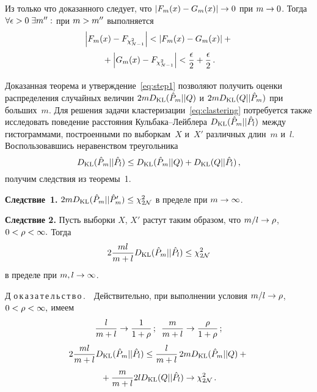 \begin{multicols}{2}
Из только что доказанного следует, что $|F_m(x) \hm- G_m(x)| \hm\rightarrow 0 $
при $m\hm\rightarrow 0$. Тогда $\forall \epsilon \hm> 0 \;\exists m'':$
при $m \hm> m''$ выполняется
\begin{multline*}
\left\vert F_m(x) - F_{\chi^2_{N-1}}\right\vert
< \left\vert F_m(x) - G_m(x)\right\vert + {}\\
{}+\left\vert G_m(x) - F_{\chi^2_{N-1}}\right\vert
< \displaystyle\frac{\displaystyle \epsilon\mathstrut}{\displaystyle 2\mathstrut} + \displaystyle\frac{\displaystyle \epsilon\mathstrut}{\displaystyle 2\mathstrut}\,.
\end{multline*}


\smallskip

Доказанная теорема и утверждение~\eqref{eq:step1} позволяют получить
оценки распределения случайных величин $2m{D}_{\mathrm{KL}}(\hat{P}_m||Q)$ и
$2m{D}_{\mathrm{KL}}(Q||\hat{P}_m)$ при больших~$m$. Для решения задачи
кластеризации~\eqref{eq:clastering} потребуется также исследовать
поведение расстояния Куль\-ба\-ка--Лейблера
${D}_{\mathrm{KL}}(\hat{P}_m||\hat{P}_l)$ между гистограммами, построенными по выборкам~$X$
и~$X'$ различных длин~$m$ и~$l$. Воспользовавшись неравенством треугольника
$$
D_{\mathrm{KL}}(\hat{P}_m||\hat{P}_l)  \leq D_{\mathrm{KL}}(\hat{P}_m||Q)
+ D_{\mathrm{KL}}(Q||\hat{P}_l)\,,
$$
получим следствия из теоремы~1.

\smallskip

\noindent
\textbf{Следствие~1.}
$ 2m{D}_{\mathrm{KL}}(\hat{P}_m||\hat{P}'_m)  \leq \chi^2_{2\mathcal{N}}$ в
пределе при $m\hm\rightarrow\infty$. \\

\smallskip

\noindent
\textbf{Следствие 2.} Пусть выборки $X$, $X'$ растут таким образом, что
$ {m}/{l} \hm\rightarrow \rho$,  $0 \hm< \rho \hm< \infty.$
Тогда
$$
2\displaystyle\frac{\displaystyle ml\mathstrut}{\displaystyle m+l\mathstrut}{D}_{\mathrm{KL}}(\hat{P}_m||\hat{P}_l)  \leq \chi^2_{2\mathcal{N}}
$$ в пределе при $m, l\hm\rightarrow\infty$.

\smallskip

\noindent
Д\,\,о\,к\,а\,з\,а\,т\,е\,л\,ь\,с\,т\,в\,о\,.\ \
Действительно, при выполнении условия  $ {m}/{l} \hm\rightarrow \rho$,
$0 \hm< \rho \hm< \infty,$ имеем
 $$
 \displaystyle\frac{\displaystyle l\mathstrut}{\displaystyle m+l\mathstrut} \rightarrow \displaystyle\frac{\displaystyle 1\mathstrut}{\displaystyle 1 + \rho\mathstrut}\,;\enskip
 \displaystyle\frac{\displaystyle m\mathstrut}{\displaystyle m+l\mathstrut} \rightarrow \displaystyle\frac{\displaystyle \rho\mathstrut}{\displaystyle 1 + \rho\mathstrut}\,;
 $$
\begin{multline*}
2\displaystyle\frac{\displaystyle ml\mathstrut}{\displaystyle m+l\mathstrut}D_{\mathrm{KL}}(\hat{P}_m||\hat{P}_l)  \leq \displaystyle\frac{\displaystyle l\mathstrut}{\displaystyle m+l\mathstrut}\,2mD_{\mathrm{KL}}(\hat{P}_m||Q)  + {}\\
{}+
\displaystyle\frac{\displaystyle m\mathstrut}{\displaystyle m+l\mathstrut}2lD_{\mathrm{KL}}(Q||\hat{P}_l) \rightarrow \chi^2_{2\mathcal{N}}\,.
\end{multline*}


\smallskip


\end{multicols}

